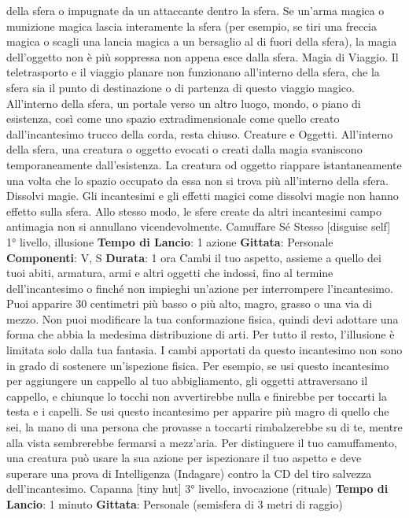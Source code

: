 \begin{multicols}{2}
della sfera o impugnate da un attaccante dentro la
sfera. Se un’arma magica o munizione magica lascia
interamente la sfera (per esempio, se tiri una freccia
magica o scagli una lancia magica a un bersaglio al di
fuori della sfera), la magia dell’oggetto non è più
soppressa non appena esce dalla sfera.
Magia di Viaggio. Il teletrasporto e il viaggio planare
non funzionano all’interno della sfera, che la sfera sia il
punto di destinazione o di partenza di questo viaggio
magico. All’interno della sfera, un portale verso un altro
luogo, mondo, o piano di esistenza, così come uno
spazio extradimensionale come quello creato
dall’incantesimo trucco della corda, resta chiuso.
Creature e Oggetti. All’interno della sfera, una creatura
o oggetto evocati o creati dalla magia svaniscono
temporaneamente dall’esistenza. La creatura od
oggetto riappare istantaneamente una volta che lo
spazio occupato da essa non si trova più all’interno
della sfera.
Dissolvi magie. Gli incantesimi e gli effetti magici come
dissolvi magie non hanno effetto sulla sfera. Allo stesso
modo, le sfere create da altri incantesimi campo antimagia non si annullano vicendevolmente.
Camuffare Sé Stesso
[disguise self]
1° livello, illusione
\textbf{Tempo di Lancio}: 1 azione
\textbf{Gittata}: Personale
\textbf{Componenti}: V, S
\textbf{Durata}: 1 ora
Cambi il tuo aspetto, assieme a quello dei tuoi abiti,
armatura, armi e altri oggetti che indossi, fino al termine
dell’incantesimo o finché non impieghi un’azione per
interrompere l’incantesimo. Puoi apparire 30 centimetri
più basso o più alto, magro, grasso o una via di mezzo.
Non puoi modificare la tua conformazione fisica, quindi
devi adottare una forma che abbia la medesima
distribuzione di arti. Per tutto il resto, l’illusione è limitata
solo dalla tua fantasia.
I cambi apportati da questo incantesimo non sono in
grado di sostenere un’ispezione fisica. Per esempio, se
usi questo incantesimo per aggiungere un cappello al
tuo abbigliamento, gli oggetti attraversano il cappello, e
chiunque lo tocchi non avvertirebbe nulla e finirebbe per
toccarti la testa e i capelli. Se usi questo incantesimo
per apparire più magro di quello che sei, la mano di una
persona che provasse a toccarti rimbalzerebbe su di te,
mentre alla vista sembrerebbe fermarsi a mezz’aria.
Per distinguere il tuo camuffamento, una creatura può
usare la sua azione per ispezionare il tuo aspetto e
deve superare una prova di Intelligenza (Indagare)
contro la CD del tiro salvezza dell’incantesimo.
Capanna
[tiny hut]
3° livello, invocazione (rituale)
\textbf{Tempo di Lancio}: 1 minuto
\textbf{Gittata}: Personale (semisfera di 3 metri di raggio)

\end{multicols}
